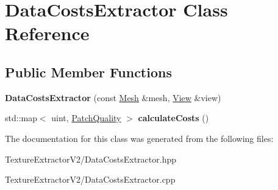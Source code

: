 \hypertarget{class_data_costs_extractor}{}\section{Data\+Costs\+Extractor Class Reference}
\label{class_data_costs_extractor}
\subsection*{Public Member Functions}
\begin{DoxyCompactItemize}
\item 
\hypertarget{class_data_costs_extractor_a43e088a660a4c58abe525cae2fb6925b}{}{\bfseries Data\+Costs\+Extractor} (const \hyperlink{class_mesh}{Mesh} \&mesh, \hyperlink{class_view}{View} \&view)\label{class_data_costs_extractor_a43e088a660a4c58abe525cae2fb6925b}

\item 
\hypertarget{class_data_costs_extractor_a7c072ab9a7ceb6e3c6742c9991923b00}{}std\+::map$<$ uint, \hyperlink{struct_patch_quality}{Patch\+Quality} $>$ {\bfseries calculate\+Costs} ()\label{class_data_costs_extractor_a7c072ab9a7ceb6e3c6742c9991923b00}

\end{DoxyCompactItemize}


The documentation for this class was generated from the following files\+:\begin{DoxyCompactItemize}
\item 
Texture\+Extractor\+V2/Data\+Costs\+Extractor.\+hpp\item 
Texture\+Extractor\+V2/Data\+Costs\+Extractor.\+cpp\end{DoxyCompactItemize}
